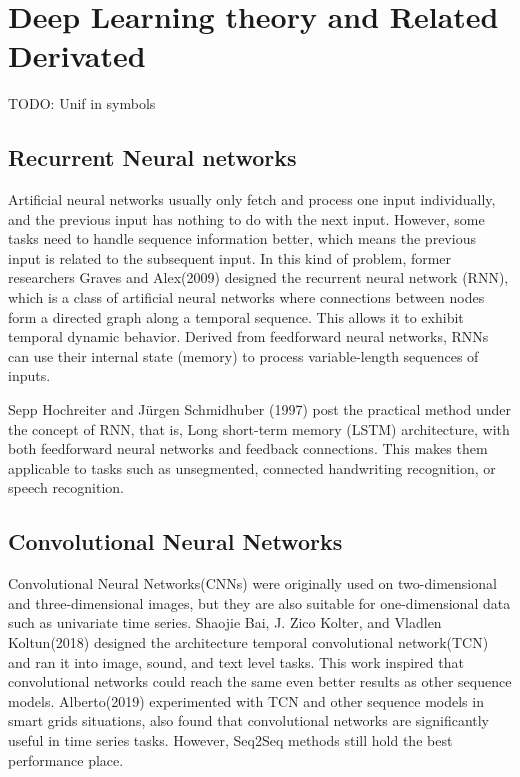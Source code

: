 
\chapter{Deep Learning theory and Related Derivated} %

\label{Chapter2} %

TODO: Unif in symbols

\section{Recurrent Neural networks}

Artificial neural networks usually only fetch and process one input individually, and the previous input has nothing to do with the next input. However, some tasks need to handle sequence information better, which means the previous input is related to the subsequent input. In this kind of problem, former researchers Graves and Alex(2009) designed the recurrent neural network (RNN), which is a class of artificial neural networks where connections between nodes form a directed graph along a temporal sequence. This allows it to exhibit temporal dynamic behavior. Derived from feedforward neural networks, RNNs can use their internal state (memory) to process variable-length sequences of inputs.

Sepp Hochreiter and Jürgen Schmidhuber (1997) post the practical method under the concept of RNN, that is, Long short-term memory (LSTM) architecture, with both feedforward neural networks and feedback connections.  This makes them applicable to tasks such as unsegmented, connected handwriting recognition, or speech recognition.

\section{Convolutional Neural Networks}

Convolutional Neural Networks(CNNs) were originally used on two-dimensional and three-dimensional images, but they are also suitable for one-dimensional data such as univariate time series. Shaojie Bai, J. Zico Kolter, and Vladlen Koltun(2018) designed the architecture temporal convolutional network(TCN) and ran it into image, sound, and text level tasks. This work inspired that convolutional networks could reach the same even better results as other sequence models. Alberto(2019) experimented with TCN and other sequence models in smart grids situations, also found that convolutional networks are significantly useful in time series tasks. However, Seq2Seq methods still hold the best performance place.

